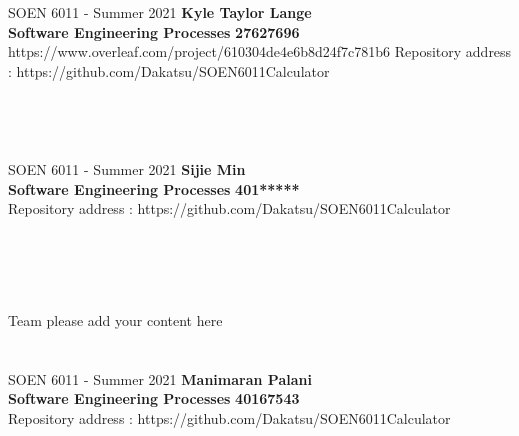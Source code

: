 \documentclass[letterpaper, 11pt]{report}
\begin{document}
\section*{}
\normalsize {SOEN 6011 - Summer 2021} \hfill \textbf{Kyle Taylor Lange} \\
\textbf{ Software Engineering Processes}  \hfill \textbf{27627696} \\https://www.overleaf.com/project/610304de4e6b8d24f7c781b6
\hfill Repository address : https://github.com/Dakatsu/SOEN6011Calculator
\\\\\\

\pagebreak

\section*{}
\normalsize {SOEN 6011 - Summer 2021} \hfill \textbf{Sijie Min} \\
\textbf{ Software Engineering Processes}  \hfill \textbf{401*****} \\
\hfill Repository address : https://github.com/Dakatsu/SOEN6011Calculator
\\\\\\\\\\
 \begin{center} Team please add your content here \end{center}
\pagebreak

\section*{}
\normalsize {SOEN 6011 - Summer 2021} \hfill \textbf{Manimaran Palani} \\
\textbf{ Software Engineering Processes}  \hfill \textbf{40167543} \\
\hfill Repository address : https://github.com/Dakatsu/SOEN6011Calculator
\\
\end{document}

